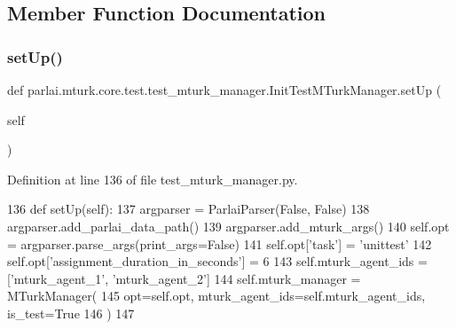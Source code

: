 \subsection{Member Function Documentation}
\mbox{\label{classparlai_1_1mturk_1_1core_1_1test_1_1test__mturk__manager_1_1InitTestMTurkManager_ac7aa478ee0d637bd5ca3fb4d40b0d483}} 
\subsubsection{\texorpdfstring{set\+Up()}{setUp()}}
{\footnotesize\ttfamily def parlai.\+mturk.\+core.\+test.\+test\+\_\+mturk\+\_\+manager.\+Init\+Test\+M\+Turk\+Manager.\+set\+Up (\begin{DoxyParamCaption}\item[{}]{self }\end{DoxyParamCaption})}



Definition at line 136 of file test\+\_\+mturk\+\_\+manager.\+py.


\begin{DoxyCode}
136     \textcolor{keyword}{def }setUp(self):
137         argparser = ParlaiParser(\textcolor{keyword}{False}, \textcolor{keyword}{False})
138         argparser.add\_parlai\_data\_path()
139         argparser.add\_mturk\_args()
140         self.opt = argparser.parse\_args(print\_args=\textcolor{keyword}{False})
141         self.opt[\textcolor{stringliteral}{'task'}] = \textcolor{stringliteral}{'unittest'}
142         self.opt[\textcolor{stringliteral}{'assignment\_duration\_in\_seconds'}] = 6
143         self.mturk\_agent\_ids = [\textcolor{stringliteral}{'mturk\_agent\_1'}, \textcolor{stringliteral}{'mturk\_agent\_2'}]
144         self.mturk\_manager = MTurkManager(
145             opt=self.opt, mturk\_agent\_ids=self.mturk\_agent\_ids, is\_test=\textcolor{keyword}{True}
146         )
147 
\end{DoxyCode}
\mbox{\label{classparlai_1_1mturk_1_1core_1_1test_1_1test__mturk__manager_1_1InitTestMTurkManager_a915e45dc058a29ebbd1942cd56418cfe}} 
